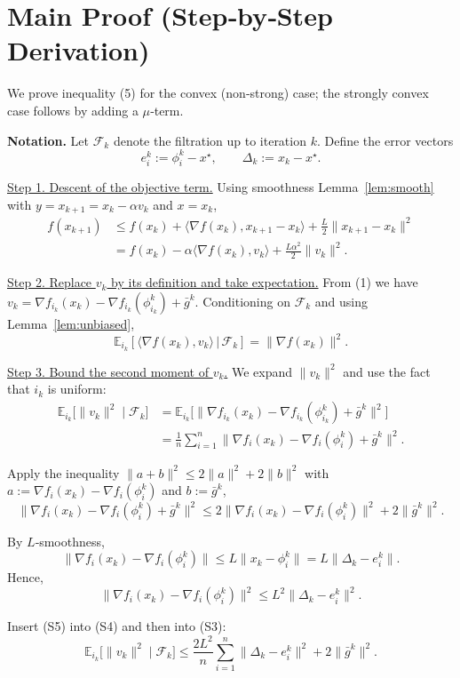 \documentclass{article}
\newcommand{\E}{\mathbb{E}}
\newcommand{\grad}{\nabla}
\begin{document}
\section*{Main Proof (Step‑by‑Step Derivation)}
We prove inequality (5) for the convex (non‑strong) case; the strongly convex case follows by adding a $\mu$‑term.

\noindent\textbf{Notation.}
Let $\mathcal{F}_k$ denote the filtration up to iteration $k$.
Define the error vectors
\[
e_i^k := \phi_i^k - x^\star ,\qquad
\Delta_k := x_k - x^\star .
\]

\noindent\underline{Step 1.  Descent of the objective term.}  
Using smoothness Lemma~\ref{lem:smooth} with $y=x_{k+1}=x_k-\alpha v_k$ and $x=x_k$,
\[
\begin{aligned}
f(x_{k+1})
&\le f(x_k)+\langle\grad f(x_k),x_{k+1}-x_k\rangle
      +\frac{L}{2}\|x_{k+1}-x_k\|^2\\[2mm]
&= f(x_k)-\alpha\langle\grad f(x_k),v_k\rangle
      +\frac{L\alpha^2}{2}\|v_k\|^2 .
\end{aligned}
\tag{S1}
\]

\noindent\underline{Step 2.  Replace $v_k$ by its definition and take expectation.}  
From (1) we have $v_k=\grad f_{i_k}(x_k)-\grad f_{i_k}(\phi_{i_k}^k)+\bar g^k$.
Conditioning on $\mathcal{F}_k$ and using Lemma~\ref{lem:unbiased},
\[
\E_{i_k}[\langle\grad f(x_k),v_k\rangle\,|\,\mathcal{F}_k]
= \|\grad f(x_k)\|^2 .
\tag{S2}
\]

\noindent\underline{Step 3.  Bound the second moment of $v_k$.}  
We expand $\|v_k\|^2$ and use the fact that $i_k$ is uniform:
\[
\begin{aligned}
\E_{i_k}\!\bigl[\|v_k\|^2\mid\mathcal{F}_k\bigr]
&= \E_{i_k}\!\bigl[\|\grad f_{i_k}(x_k)-\grad f_{i_k}(\phi_{i_k}^k)+\bar g^k\|^2\bigr]\\
&= \frac1n\sum_{i=1}^n\|\grad f_i(x_k)-\grad f_i(\phi_i^k)+\bar g^k\|^2 .
\end{aligned}
\tag{S3}
\]

Apply the inequality $\|a+b\|^2\le2\|a\|^2+2\|b\|^2$ with 
$a:=\grad f_i(x_k)-\grad f_i(\phi_i^k)$ and $b:=\bar g^k$,
\[
\|\grad f_i(x_k)-\grad f_i(\phi_i^k)+\bar g^k\|^2
\le 2\|\grad f_i(x_k)-\grad f_i(\phi_i^k)\|^2+2\|\bar g^k\|^2 .
\tag{S4}
\]

By $L$‑smoothness,
\[
\|\grad f_i(x_k)-\grad f_i(\phi_i^k)\| \le L\|x_k-\phi_i^k\|
= L\|\Delta_k-e_i^k\| .
\]
Hence,
\[
\|\grad f_i(x_k)-\grad f_i(\phi_i^k)\|^2
\le L^2\|\Delta_k-e_i^k\|^2 .
\tag{S5}
\]

Insert (S5) into (S4) and then into (S3):
\[
\E_{i_k}\!\bigl[\|v_k\|^2\mid\mathcal{F}_k\bigr]
\le \frac{2L^2}{n}\sum_{i=1}^n\|\Delta_k-e_i^k\|^2
   +2\|\bar g^k\|^2 .
\tag{S6}
\]
\end{document}
